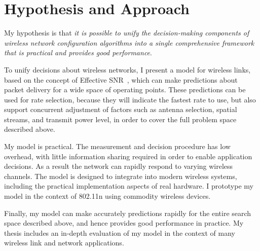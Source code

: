 

\section{Hypothesis and Approach}
\label{sec:intro_approach}
My hypothesis is that \emph{it is possible to unify the decision-making components of wireless network configuration algorithms into a single comprehensive framework that is practical and provides good performance}.

To unify decisions about wireless networks, I present a model for wireless links, based on the concept of Effective SNR~\cite{Nanda_EffectiveSNR}, which can make predictions about packet delivery for a wide space of operating points. These predictions can be used for rate selection, because they will indicate the fastest rate to use, but also support concurrent adjustment of factors such as antenna selection, spatial streams, and transmit power level, in order to cover the full problem space described above.

My model is practical. The measurement and decision procedure has low overhead, with little information sharing required in order to enable application decisions. As a result the network can rapidly respond to varying wireless channels. The model is designed to integrate into modern wireless systems, including the practical implementation aspects of real hardware. I prototype my model in the context of 802.11n using commodity wireless devices.

Finally, my model can make accurately predictions rapidly for the entire search space described above, and hence provides good performance in practice. My thesis includes an in-depth evaluation of my model in the context of many wireless link and network applications.


